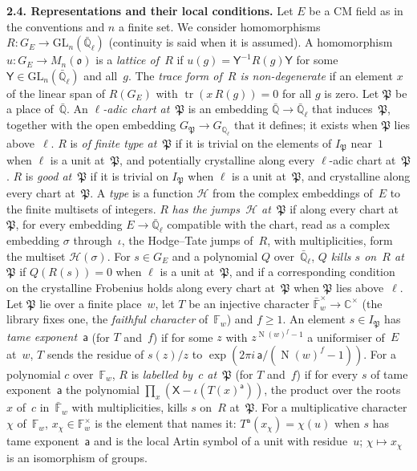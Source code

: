 \documentclass[11pt,a4paper]{article}
\newcommand{\F}{\mathbb{F}}
\newcommand{\m}[1]{\mbox{$#1$}}        %
\newcommand{\subhead}[1]{\par\addvspace{9pt plus 2pt}\Needspace{4\baselineskip}\noindent\textbf{#1}\enspace\ignorespaces}
\theoremstyle{plainx}
\theoremstyle{uprightx}
\newcommand{\CC}{\mathbb{C}}
\newcommand{\Qb}{\bar{\mathbb{Q}}}
\newcommand{\Qlb}{\bar{\mathbb{Q}}_\ell}
\newcommand{\Gl}{G_{\mathbb{Q}_\ell}}
\newcommand{\GE}[1]{G_{#1}}
\newcommand{\Nm}{\operatorname{N}}
\newcommand{\fo}{\mathfrak{o}}
\newcommand{\fP}{\mathfrak{P}}
\newcommand{\HT}{\mathcal{H}}
\newcommand{\GL}{\mathrm{GL}}
\newcommand{\tr}{\operatorname{tr}}
\begin{document}
\subhead{2.4. Representations and their local conditions.} Let $E$ be a CM field as in the conventions and $n$
a finite set. We consider homomorphisms \m{R\colon\GE{E}\to\GL_n(\Qlb)} (continuity is said when it is assumed).
A homomorphism \m{u\colon\GE{E}\to M_n(\fo)} is a \emph{lattice of~$R$} if \m{u(g)=\mathsf{Y}^{-1}R(g)\mathsf{Y}} for some
\m{\mathsf{Y}\in\GL_n(\Qlb)} and all~$g$. The \emph{trace form of~$R$ is non-degenerate} if an element $x$ of the linear
span of \m{R(\GE{E})} with \m{\tr(x\,R(g))=0} for all $g$ is zero. Let $\fP$ be a place of~\m{\Qb}. An
\emph{$\ell$-adic chart at~$\fP$} is an embedding \m{\Qb\to\Qlb} that induces~$\fP$, together with the open
embedding \m{G_{\fP}\to\Gl} that it defines; it exists when $\fP$ lies above~$\ell$. $R$ is \emph{of finite type
at~$\fP$} if it is trivial on the elements of \m{I_{\fP}} near~$1$ when $\ell$ is a unit at~$\fP$, and potentially
crystalline along every $\ell$-adic chart at~$\fP$. $R$ is \emph{good at~$\fP$} if it is trivial on \m{I_{\fP}} when
$\ell$ is a unit at~$\fP$, and crystalline along every chart at~$\fP$. A \emph{type} is a function $\HT$ from the
complex embeddings of~$E$ to the finite multisets of integers. $R$ \emph{has the jumps~$\HT$ at~$\fP$} if along
every chart at~$\fP$, for every embedding \m{E\to\Qlb} compatible with the chart, read as a complex embedding
$\sigma$ through~$\iota$, the Hodge--Tate jumps of~$R$, with multiplicities, form the multiset \m{\HT(\sigma)}.
For \m{s\in\GE{E}} and a polynomial $Q$ over~\m{\Qlb}, \emph{$Q$ kills $s$ on~$R$ at~$\fP$} if \m{Q(R(s))=0} when
$\ell$ is a unit at~$\fP$, and if a corresponding condition on the crystalline Frobenius holds along every chart
at~$\fP$ when $\fP$ lies above~$\ell$. Let $\fP$ lie over a finite place~$w$, let $T$ be an injective character
\m{\bar{\F}_w^{\times}\to\CC^{\times}} (the library fixes one, the \emph{faithful character} of~$\F_w$) and
\m{f\ge1}. An element \m{s\in I_{\fP}} has \emph{tame exponent~$\mathsf{a}$} (for $T$ and~$f$) if for some $z$ with
\m{z^{\Nm(w)^f-1}} a uniformiser of~$E$ at~$w$, $T$ sends the residue of \m{s(z)/z} to
\m{\exp(2\pi i\,\mathsf{a}/(\Nm(w)^f-1))}. For a polynomial $c$ over~$\F_w$, $R$ is \emph{labelled by~$c$ at~$\fP$} (for $T$
and~$f$) if for every $s$ of tame exponent~$\mathsf{a}$ the polynomial \m{\prod_{x}(\mathsf{X}-\iota(T(x)^{\mathsf{a}}))}, the product over
the roots $x$ of~$c$ in~$\bar{\F}_w$ with multiplicities, kills $s$ on~$R$ at~$\fP$. For a multiplicative
character $\chi$ of~$\F_w$, \m{x_\chi\in\F_w^{\times}} is the element that names it: \m{T^{\mathsf{a}}(x_\chi)=\chi(u)} when
$s$ has tame exponent~$\mathsf{a}$ and is the local Artin symbol of a unit with residue~$u$; \m{\chi\mapsto x_\chi} is an
isomorphism of groups.
\end{document}
